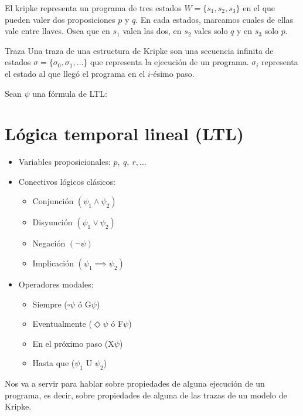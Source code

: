 El kripke representa un programa de tres estados $W=\{s_1,s_2,s_3\}$ en el que pueden valer dos proposiciones $p$ y $q$. En cada estados, marcamos cuales de ellas vale entre llaves. Osea que en $s_1$ valen las dos, en $s_2$ vales solo $q$ y en $s_3$ solo $p$.

\begin{definicion}{Traza}
Una traza de una estructura de Kripke son una secuencia infinita de estados $\sigma = \{\sigma_0,\sigma_1,\dots\}$ que representa la ejecución de un programa. $\sigma_i$ representa el estado al que llegó el programa en el $i$-ésimo paso.
\end{definicion}

\newpage
Sean $\psi$ una fórmula de LTL:
\section{Lógica temporal lineal (LTL)}
\begin{itemize}
\item Variables proposicionales: $p,~q,~r,\dots$
\item Conectivos lógicos clásicos: 
\begin{multicols}{2}
\begin{itemize}
\item Conjunción $(\psi_1 \land \psi_2)$
\item Disyunción $(\psi_1 \lor \psi_2)$
\item Negación $(\lnot \psi)$
\item Implicación $(\psi_1 \implies \psi_2)$
\end{itemize}
\end{multicols}
\item Operadores modales:
\begin{multicols}{2}
\begin{itemize}
\item Siempre ($\square \psi$ ó G$\psi$)
\item Eventualmente ($\Diamond \psi$ ó F$\psi$)
\item En el próximo paso (X$\psi$)
\item Hasta que ($\psi_1$ U $\psi_2$)
\end{itemize}
\end{multicols}
\end{itemize}

Nos va a servir para hablar sobre propiedades de alguna ejecución de un programa, es decir, sobre propiedades de alguna de las trazas de un modelo de Kripke.



